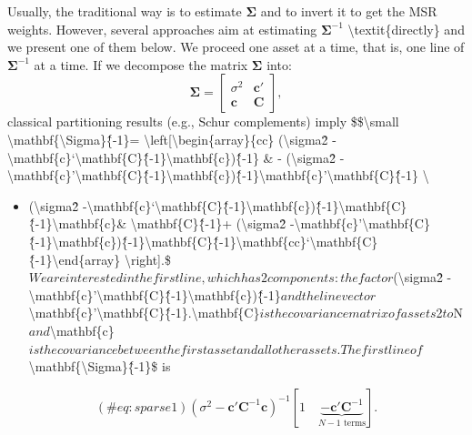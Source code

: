 Usually, the traditional way is to estimate $\boldsymbol{\Sigma}$ and to invert it to get the MSR weights. However, several approaches aim at estimating $\boldsymbol{\Sigma}^{ -1}$ {\textbackslash}textit\{directly\} and we present one of them below. We proceed one asset at a time, that is, one line of $\boldsymbol{\Sigma}^{ -1}$ at a time.\newline
If we decompose the matrix $\mathbf{\Sigma}$ into:
\begin{equation}
\mathbf{\Sigma}= \left[\begin{array}{cc} \sigma^2 & \mathbf{c}' \\
\mathbf{c}& \mathbf{C}\end{array} \right],
\end{equation}
classical partitioning results (e.g., Schur complements) imply
\$\${\textbackslash}small {\textbackslash}mathbf\{{\textbackslash}Sigma\}\^\{-1\}= {\textbackslash}left[{\textbackslash}begin\{array\}\{cc\} ({\textbackslash}sigma\^2 -{\textbackslash}mathbf\{c\}`{\textbackslash}mathbf\{C\}\^\{-1\}{\textbackslash}mathbf\{c\})\^\{-1\} \& - ({\textbackslash}sigma\^2 -{\textbackslash}mathbf\{c\}'{\textbackslash}mathbf\{C\}\^\{-1\}{\textbackslash}mathbf\{c\})\^\{-1\}{\textbackslash}mathbf\{c\}'{\textbackslash}mathbf\{C\}\^\{-1\} {\textbackslash}

\begin{itemize}
\item ({\textbackslash}sigma\^2 -{\textbackslash}mathbf\{c\}`{\textbackslash}mathbf\{C\}\^\{-1\}{\textbackslash}mathbf\{c\})\^\{-1\}{\textbackslash}mathbf\{C\}\^\{-1\}{\textbackslash}mathbf\{c\}\& {\textbackslash}mathbf\{C\}\^\{-1\}+ ({\textbackslash}sigma\^2 -{\textbackslash}mathbf\{c\}'{\textbackslash}mathbf\{C\}\^\{-1\}{\textbackslash}mathbf\{c\})\^\{-1\}{\textbackslash}mathbf\{C\}\^\{-1\}{\textbackslash}mathbf\{cc\}`{\textbackslash}mathbf\{C\}\^\{-1\}{\textbackslash}end\{array\} {\textbackslash}right].\$$We are interested in the first line, which has 2 components: the factor$({\textbackslash}sigma\^2 -{\textbackslash}mathbf\{c\}'{\textbackslash}mathbf\{C\}\^\{-1\}{\textbackslash}mathbf\{c\})\^\{-1\}$and the line vector${\textbackslash}mathbf\{c\}'{\textbackslash}mathbf\{C\}\^\{-1\}$.${\textbackslash}mathbf\{C\}$is the covariance matrix of assets$2$to$N$and${\textbackslash}mathbf\{c\}$is the covariance between the first asset and all other assets. The first line of${\textbackslash}mathbf\{{\textbackslash}Sigma\}\^\{-1\}\$ is
\end{itemize}
\begin{equation}
(\#eq:sparse1)
(\sigma^2 -\mathbf{c}'\mathbf{C}^{-1}\mathbf{c})^{-1} \left[1 \quad  \underbrace{-\mathbf{c}'\mathbf{C}^{-1}}_{N-1 \text{ terms}} \right].
\end{equation}

